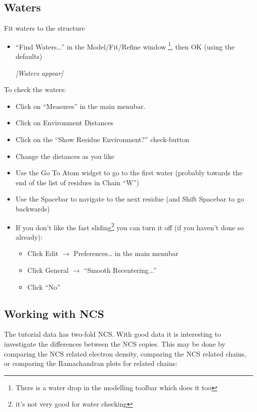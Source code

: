 \documentclass{article}
\begin{document}
\subsection{Waters}
Fit waters to the structure
\begin{itemize}
\item \textsf{``Find Waters\ldots''} in the Model/Fit/Refine window
  \footnote{There is a water drop in the modelling toolbar which does it too},
  then OK (using the defaults)

\textsl{ [Waters appear]}

\end{itemize}
To check the waters:
\begin{itemize}
\item Click on \textsf{``Measures''} in the main menubar.  
\item Click on \textsf{Environment Distances}
\item Click on the \textsf{``Show Residue Environment?''} check-button
\item Change the distances as you like
\item Use the Go To Atom widget to go to the first water (probably
  towards the end of the list of residues in Chain ``W'')
\item Use the Spacebar to navigate to the next residue (and Shift
  Spacebar to go backwards)
\item If you don't like the fast sliding\footnote{it's not very good
    for water checking} you can turn it off (if you haven't done so already):
  \begin{itemize}
  \item Click \textsf{Edit $\rightarrow$ Preferences\ldots} in the main menubar
  \item Click \textsf{General $\rightarrow$ ``Smooth Recentering...''}
  \item Click \textsf{``No''}
  \end{itemize}
\end{itemize}


\subsection{Working with NCS}

The tutorial data has two-fold NCS. With good data it is interesting
to investigate the differences between the NCS copies. This may be
done by comparing the NCS related electron density, comparing the NCS
related chains, or comparing the Ramachandran plots for related chains:
\end{document}
